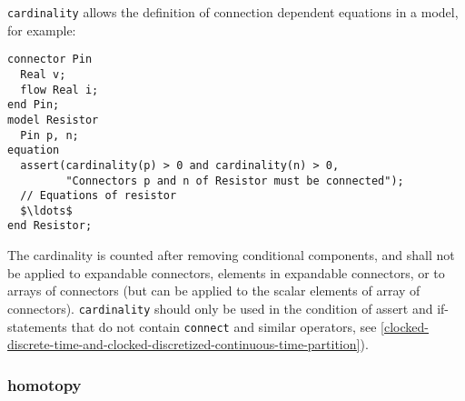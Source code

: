 \begin{nonnormative}
\lstinline!cardinality! allows the definition of connection dependent equations in a model, for example:
\begin{lstlisting}[language=modelica]
connector Pin
  Real v;
  flow Real i;
end Pin;
model Resistor
  Pin p, n;
equation
  assert(cardinality(p) > 0 and cardinality(n) > 0,
         "Connectors p and n of Resistor must be connected");
  // Equations of resistor
  $\ldots$
end Resistor;
\end{lstlisting}
\end{nonnormative}

The cardinality is counted after removing conditional components, and shall not be applied to expandable connectors, elements in expandable connectors, or to arrays of connectors (but can be applied to
the scalar elements of array of connectors).  \lstinline!cardinality! should only be used in the condition of assert and if-statements that do not contain \lstinline!connect! and similar operators,
see \cref{clocked-discrete-time-and-clocked-discretized-continuous-time-partition}).

\subsubsection{homotopy}\label{homotopy}


